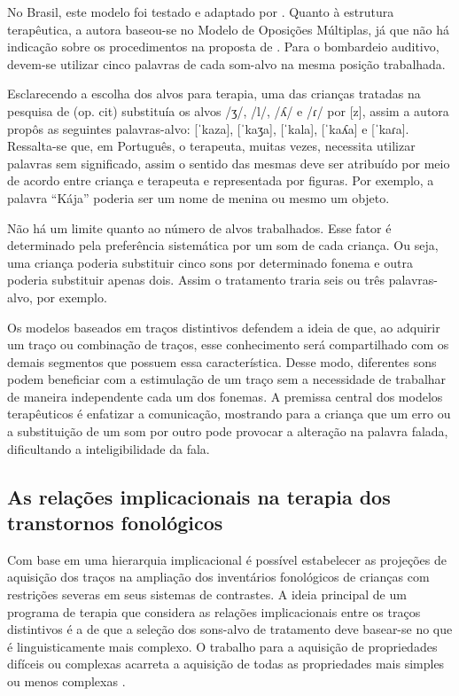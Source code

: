 \documentclass[output=paper,colorlinks,citecolor=brown,booklanguage=portuguese]{langscibook}
\begin{document}
No Brasil, este modelo foi testado e adaptado por \citet{Ceron2009}. Quanto à estrutura terapêutica, a autora baseou-se no Modelo de Oposições Múltiplas, já que não há indicação sobre os procedimentos na proposta de \citet{Williams2000}. Para o bombardeio auditivo, devem-se utilizar cinco palavras de cada som-alvo na mesma posição trabalhada.

Esclarecendo a escolha dos alvos para terapia, uma das crianças tratadas na pesquisa de \citeauthor{Ceron2009} (op. cit) substituía os alvos /ʒ/, /l/, /ʎ/ e /ɾ/ por [z], assim a autora propôs as seguintes palavras-alvo: [ˈkaza], [ˈkaʒa], [ˈkala], [ˈkaʎa] e [ˈkaɾa]. Ressalta-se que, em Português, o terapeuta, muitas vezes, necessita utilizar palavras sem significado, assim o sentido das mesmas deve ser atribuído por meio de acordo entre criança e terapeuta e representada por figuras. Por exemplo, a palavra “Kája” poderia ser um nome de menina ou mesmo um objeto.

Não há um limite quanto ao número de alvos trabalhados. Esse fator é determinado pela preferência sistemática por um som de cada criança. Ou seja, uma criança poderia substituir cinco sons por determinado fonema e outra poderia substituir apenas dois. Assim o tratamento traria seis ou três palavras-alvo, por exemplo.

Os modelos baseados em traços distintivos defendem a ideia de que, ao adquirir um traço ou combinação de traços, esse conhecimento será compartilhado com os demais segmentos que possuem essa característica. Desse modo, diferentes sons podem beneficiar com a estimulação de um traço sem a necessidade de trabalhar de maneira independente cada um dos fonemas. A premissa central dos modelos terapêuticos é enfatizar a comunicação, mostrando para a criança que um erro ou a substituição de um som por outro pode provocar a alteração na palavra falada, dificultando a inteligibilidade da fala.

\subsection{As relações implicacionais na terapia dos transtornos fonológicos}\label{sec:cap5sec2tres}
Com base em uma hierarquia implicacional é possível estabelecer as projeções de aquisição dos traços na ampliação dos inventários fonológicos de crianças com restrições severas em seus sistemas de contrastes. A ideia principal de um programa de terapia que considera as relações implicacionais entre os traços distintivos é a de que a seleção dos sons-alvo de tratamento deve basear-se no que é linguisticamente mais complexo. O trabalho para a aquisição de propriedades difíceis ou complexas acarreta a aquisição de todas as propriedades mais simples ou menos complexas \citep{Jakobson1972, Dinnsen1990, Mota1996}.
\end{document}
